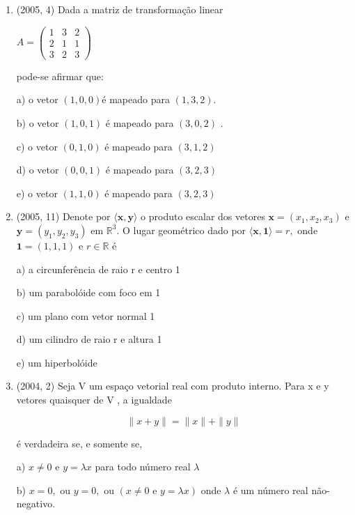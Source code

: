 \documentclass{article}
\begin{document}
\begin{enumerate}
\item(2005, 4) Dada a matriz de transformação linear


$A=\left(\begin{array}{lll}{1} & {3} & {2} \\ {2} & {1} & {1} \\ {3} & {2} & {3}\end{array}\right)$

pode-se afirmar que:


a) o vetor $(1,0,0) é$ mapeado para $(1,3,2) .$

b) o vetor $(1,0,1)$ é mapeado para $(3,0,2)$ .

c) o vetor $(0,1,0)$ é mapeado para $(3,1,2)$

d) o vetor $(0,0,1)$ é mapeado para $(3,2,3)$

e) o vetor $(1,1,0)$ é mapeado para $(3,2,3)$ \newline






\item(2005, 11) Denote por $\langle\mathbf{x}, \mathbf{y}\rangle$ o produto escalar dos vetores $\mathbf{x}=\left(x_{1}, x_{2}, x_{3}\right)$ e $\mathbf{y}=\left(y_{1}, y_{2}, y_{3}\right)$ em
$\mathbb{R}^{3} .$ O lugar geométrico dado por $\langle\mathbf{x}, \mathbf{1}\rangle= r,$ onde $\mathbf{1}=(1,1,1)$ e $r \in \mathbb{R}$ é

a) a circunferência de raio r e centro 1

b) um parabolóide com foco em 1

c) um plano com vetor normal 1

d) um cilindro de raio r e altura 1

e) um hiperbolóide \newline









\item(2004, 2) Seja V um espaço vetorial real com produto interno. Para x e y vetores quaisquer de V , a igualdade

$$\|x+y\|=\|x\|+\|y\|$$

é verdadeira se, e somente se,

a) $x \neq 0$ e $y=\lambda x$ para todo número real $\lambda$

b) $x=0,$ ou $y=0,$ ou $(x \neq 0 \text { e } y=\lambda x)$ onde $\lambda$ é um número real não-negativo.


\end{enumerate}
\end{document}
